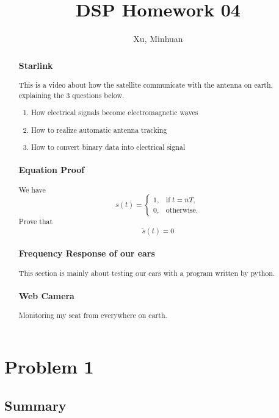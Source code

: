 \documentclass{article}
\begin{document}
\title{DSP Homework 04}
\author{Xu, Minhuan}
\maketitle
\tableofcontents
\begin{abstract}
\subsubsection*{Starlink}
This is a video about how the satellite communicate with the antenna on earth, explaining the 3 questions below.
\begin{enumerate}
    \item How electrical signals become electromagnetic waves
    \item How to realize automatic antenna tracking
    \item How to convert binary data into electrical signal
\end{enumerate}

\subsubsection*{Equation Proof}
We have
$$
s(t) = 
\left\{
    \begin{array}{lr}
        1, & \mathrm{if}\; t = nT,\\
        0, & \mathrm{otherwise.}
    \end{array}
\right.
$$
Prove that
$$
\widetilde{s}(t) = 0
$$

\subsubsection*{Frequency Response of our ears}
This section is mainly about testing our ears with a program written by python.

\subsubsection*{Web Camera}
Monitoring my seat from everywhere on earth.
\end{abstract}

\section{Problem 1}
\subsection{Summary}
\end{document}
